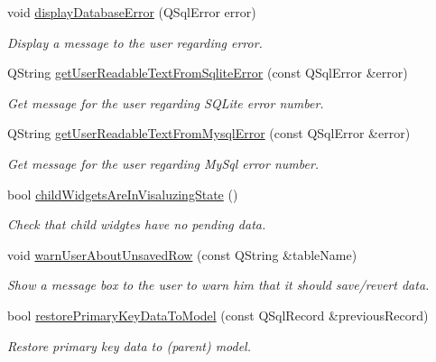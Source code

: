 \begin{DoxyCompactItemize}
void \hyperlink{classmdt_abstract_sql_widget_a3401020fed292da2c3b565a536f0be47}{displayDatabaseError} (QSqlError error)
\begin{DoxyCompactList}\small\item\em Display a message to the user regarding error. \end{DoxyCompactList}\item 
\hypertarget{classmdt_abstract_sql_widget_aeeddeec556cc20c5c9a49559df7898d9}{
QString \hyperlink{classmdt_abstract_sql_widget_aeeddeec556cc20c5c9a49559df7898d9}{getUserReadableTextFromSqliteError} (const QSqlError \&error)}
\label{classmdt_abstract_sql_widget_aeeddeec556cc20c5c9a49559df7898d9}

\begin{DoxyCompactList}\small\item\em Get message for the user regarding SQLite error number. \end{DoxyCompactList}\item 
\hypertarget{classmdt_abstract_sql_widget_a1081ced9b96f60b3b39c6085bfe305d4}{
QString \hyperlink{classmdt_abstract_sql_widget_a1081ced9b96f60b3b39c6085bfe305d4}{getUserReadableTextFromMysqlError} (const QSqlError \&error)}
\label{classmdt_abstract_sql_widget_a1081ced9b96f60b3b39c6085bfe305d4}

\begin{DoxyCompactList}\small\item\em Get message for the user regarding MySql error number. \end{DoxyCompactList}\item 
\hypertarget{classmdt_abstract_sql_widget_aebd051866b148eb6f60a10c6ac648efa}{
bool \hyperlink{classmdt_abstract_sql_widget_aebd051866b148eb6f60a10c6ac648efa}{childWidgetsAreInVisaluzingState} ()}
\label{classmdt_abstract_sql_widget_aebd051866b148eb6f60a10c6ac648efa}

\begin{DoxyCompactList}\small\item\em Check that child widgtes have no pending data. \end{DoxyCompactList}\item 
\hypertarget{classmdt_abstract_sql_widget_ad20a178299c96790587b53380bb68282}{
void \hyperlink{classmdt_abstract_sql_widget_ad20a178299c96790587b53380bb68282}{warnUserAboutUnsavedRow} (const QString \&tableName)}
\label{classmdt_abstract_sql_widget_ad20a178299c96790587b53380bb68282}

\begin{DoxyCompactList}\small\item\em Show a message box to the user to warn him that it should save/revert data. \end{DoxyCompactList}\item 
bool \hyperlink{classmdt_abstract_sql_widget_ac93226881ba03311a6a95ecd2ddaa003}{restorePrimaryKeyDataToModel} (const QSqlRecord \&previousRecord)
\begin{DoxyCompactList}\small\item\em Restore primary key data to (parent) model. \end{DoxyCompactList}\end{DoxyCompactItemize}


